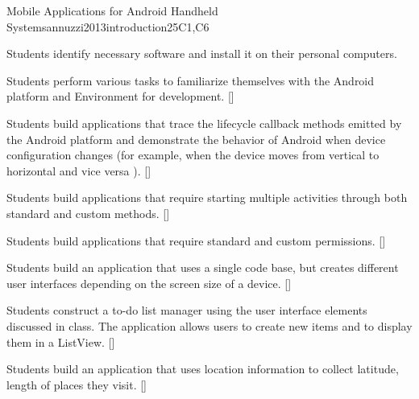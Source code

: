 \begin{syllabus}
\begin{unit}{Mobile Applications for Android Handheld Systems}{}{annuzzi2013introduction}{25}{C1,C6}
\begin{learningoutcomes}
    \item Students identify necessary software and install it on their personal computers.
    \item Students perform various tasks to familiarize themselves with the Android platform and Environment for development. [\Usage]
    \item Students build applications that trace the lifecycle callback methods emitted by the Android platform and demonstrate the behavior of Android when device configuration changes (for example, when the device moves from vertical to horizontal and vice versa ). [\Usage]
    \item Students build applications that require starting multiple activities through both standard and custom methods. [\Usage]
    \item Students build applications that require standard and custom permissions. [\Usage]
    \item Students build an application that uses a single code base, but creates different user interfaces depending on the screen size of a device. [\Usage]
    \item Students construct a to-do list manager using the user interface elements discussed in class. The application allows users to create new items and to display them in a ListView. [\Usage]
    \item Students build an application that uses location information to collect latitude, length of places they visit. [\Usage]
\end{learningoutcomes}
\end{unit}




\begin{coursebibliography}
\end{coursebibliography}

\end{syllabus}
